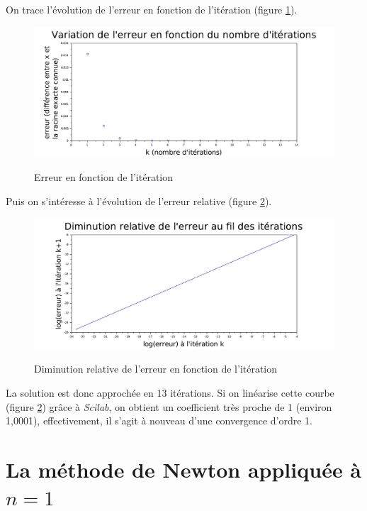 \documentclass[a4paper,10pt]{report}
\begin{document}
\newpage
On trace l'évolution de l'erreur en fonction de l'itération (figure \ref{graph_pointfixe}).
\begin{figure}[H]
\centering
\caption{Erreur en fonction de l'itération}
\includegraphics[width=\textwidth]{graphpointfixe.pdf}
\label{graph_pointfixe}
\end{figure}

Puis on s'intéresse à l'évolution de l'erreur relative (figure \ref{erreur_pointfixe}).
\begin{center}
\begin{figure}[H]
\caption{Diminution relative de l'erreur en fonction de l'itération}
\includegraphics[width=\textwidth]{graphpointfixe_reg.pdf}
\label{erreur_pointfixe}
\end{figure}
\end{center}

La solution est donc approchée en 13 itérations. Si on linéarise cette courbe (figure \ref{erreur_pointfixe}) grâce à \textit{Scilab}, on obtient un coefficient très proche de 1 (environ 1,0001), effectivement, il s'agit à nouveau d'une convergence d'ordre 1.

\newpage
\section{La méthode de Newton appliquée à $n=1$}
\end{document}
